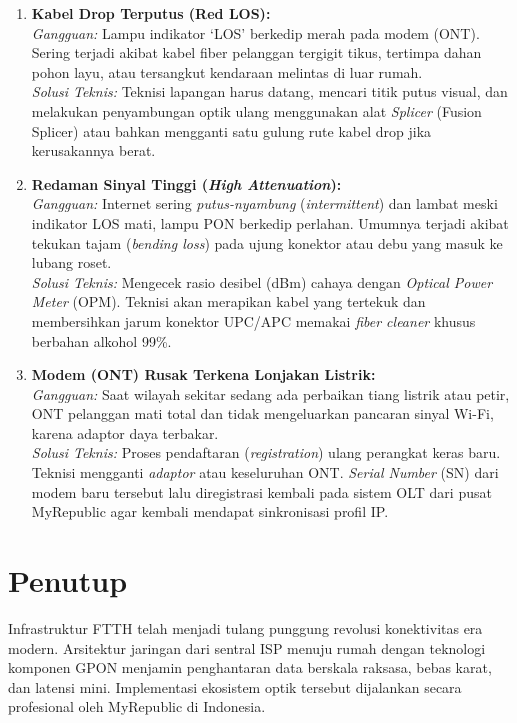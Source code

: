 \documentclass[12pt,a4paper]{article}
\begin{document}
\begin{enumerate}
    \item \textbf{Kabel Drop Terputus (Red LOS):}\\
    \textit{Gangguan:} Lampu indikator `LOS' berkedip merah pada modem (ONT). Sering terjadi akibat kabel fiber pelanggan tergigit tikus, tertimpa dahan pohon layu, atau tersangkut kendaraan melintas di luar rumah.\\
    \textit{Solusi Teknis:} Teknisi lapangan harus datang, mencari titik putus visual, dan melakukan penyambungan optik ulang menggunakan alat \textit{Splicer} (Fusion Splicer) atau bahkan mengganti satu gulung rute kabel drop jika kerusakannya berat.
    \item \textbf{Redaman Sinyal Tinggi (\textit{High Attenuation}):}\\
    \textit{Gangguan:} Internet sering \textit{putus-nyambung} (\textit{intermittent}) dan lambat meski indikator LOS mati, lampu PON berkedip perlahan. Umumnya terjadi akibat tekukan tajam (\textit{bending loss}) pada ujung konektor atau debu yang masuk ke lubang roset.\\
    \textit{Solusi Teknis:} Mengecek rasio desibel (dBm) cahaya dengan \textit{Optical Power Meter} (OPM). Teknisi akan merapikan kabel yang tertekuk dan membersihkan jarum konektor UPC/APC memakai \textit{fiber cleaner} khusus berbahan alkohol 99\%.
    \item \textbf{Modem (ONT) Rusak Terkena Lonjakan Listrik:}\\
    \textit{Gangguan:} Saat wilayah sekitar sedang ada perbaikan tiang listrik atau petir, ONT pelanggan mati total dan tidak mengeluarkan pancaran sinyal Wi-Fi, karena adaptor daya terbakar.\\
    \textit{Solusi Teknis:} Proses pendaftaran (\textit{registration}) ulang perangkat keras baru. Teknisi mengganti \textit{adaptor} atau keseluruhan ONT. \textit{Serial Number} (SN) dari modem baru tersebut lalu diregistrasi kembali pada sistem OLT dari pusat MyRepublic agar kembali mendapat sinkronisasi profil IP.
\end{enumerate}

\section{Penutup}

Infrastruktur FTTH telah menjadi tulang punggung revolusi konektivitas era modern. Arsitektur jaringan dari sentral ISP menuju rumah dengan teknologi komponen GPON menjamin penghantaran data berskala raksasa, bebas karat, dan latensi mini. Implementasi ekosistem optik tersebut dijalankan secara profesional oleh MyRepublic di Indonesia. 
\end{document}
